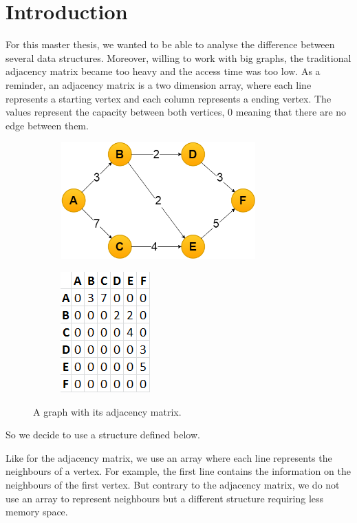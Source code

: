\section{Introduction}
For this master thesis, we wanted to be able to analyse the difference between several data structures. Moreover, willing to work with big graphs, the traditional adjacency matrix became too heavy and the access time was too low. 
As a reminder, an adjacency matrix is a two dimension array, where each line represents a starting vertex and each column represents a ending vertex. The values represent the capacity between both vertices, 0 meaning that there are no edge between them. \newline

\begin{figure}[!h]
\begin{subfigure}{.6\textwidth}
\includegraphics[width=7.5cm,height=4.5cm]{images/graph.png}
\end{subfigure}
\begin{subfigure}{.4\textwidth}
\includegraphics[scale=0.7]{images/adjacencyMatrix.png}
\end{subfigure}
\caption{A graph with its adjacency matrix.}
\end{figure}

So we decide to use a structure defined below. \newline

Like for the adjacency matrix, we use an array where each line represents the neighbours of a vertex. For example, the first line contains the information on the neighbours of the first vertex. But contrary to the adjacency matrix, we do not use an array to represent neighbours but a different structure requiring less memory space. \newline

